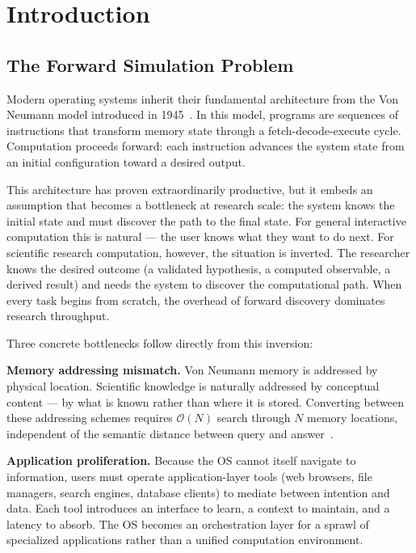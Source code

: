 \documentclass[12pt,twocolumn]{article}
\begin{document}
\section{Introduction}
\label{sec:introduction}

\subsection{The Forward Simulation Problem}

Modern operating systems inherit their fundamental architecture from the Von Neumann model introduced in 1945~\cite{hennessy2011computer}. In this model, programs are sequences of instructions that transform memory state through a fetch-decode-execute cycle. Computation proceeds forward: each instruction advances the system state from an initial configuration toward a desired output.

This architecture has proven extraordinarily productive, but it embeds an assumption that becomes a bottleneck at research scale: the system knows the initial state and must discover the path to the final state. For general interactive computation this is natural --- the user knows what they want to do next. For scientific research computation, however, the situation is inverted. The researcher knows the desired outcome (a validated hypothesis, a computed observable, a derived result) and needs the system to discover the computational path. When every task begins from scratch, the overhead of forward discovery dominates research throughput.

Three concrete bottlenecks follow directly from this inversion:

\textbf{Memory addressing mismatch.} Von Neumann memory is addressed by physical location. Scientific knowledge is naturally addressed by conceptual content --- by what is known rather than where it is stored. Converting between these addressing schemes requires $\mathcal{O}(N)$ search through $N$ memory locations, independent of the semantic distance between query and answer~\cite{silberschatz2018operating}.

\textbf{Application proliferation.} Because the OS cannot itself navigate to information, users must operate application-layer tools (web browsers, file managers, search engines, database clients) to mediate between intention and data. Each tool introduces an interface to learn, a context to maintain, and a latency to absorb. The OS becomes an orchestration layer for a sprawl of specialized applications rather than a unified computation environment.
\end{document}
